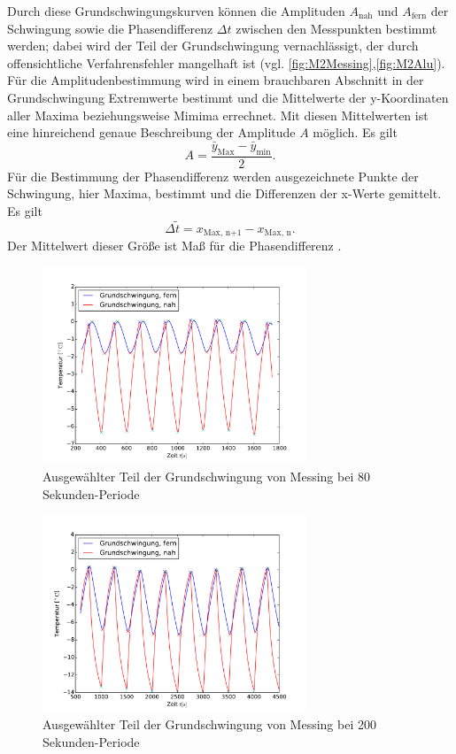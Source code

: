 Durch diese Grundschwingungskurven können die Amplituden $A_{\text{nah}}$ und $A_{\text{fern}}$ der Schwingung sowie die Phasendifferenz $\Delta t$ zwischen den Messpunkten bestimmt werden; 
dabei wird der Teil der Grundschwingung vernachlässigt, der durch offensichtliche Verfahrensfehler mangelhaft ist
(vgl. \ref{fig:M2Messing},\ref{fig:M2Alu}).
Für die Amplitudenbestimmung wird in einem brauchbaren Abschnitt in der Grundschwingung Extremwerte bestimmt und die Mittelwerte der y-Koordinaten aller Maxima beziehungsweise Mimima errechnet.
Mit diesen Mittelwerten ist eine hinreichend genaue Beschreibung der Amplitude $A$ möglich.
Es gilt
\begin{equation}
	A = \frac{\bar{y}_{\text{Max}}-\bar{y}_{\text{min}}}{2}.
\end{equation}
Für die Bestimmung der Phasendifferenz werden ausgezeichnete Punkte der Schwingung, hier Maxima, bestimmt und die Differenzen der x-Werte  gemittelt.
Es gilt
\begin{equation}
	\Delta \tilde{t} = {x}_{\text{Max, n+1}}-{x}_{\text{Max, n}}.
\end{equation}
Der Mittelwert dieser Größe ist Maß für die Phasendifferenz .
\begin{figure}[p]
	\label{fig:M2MessingNormkurve}
	\centering
	\includegraphics[width=0.7\textwidth]{Bilder/M2_Messing_norm.pdf}
	\caption{Ausgewählter Teil der Grundschwingung von Messing bei 80 Sekunden-Periode}
\end{figure}
\begin{figure}[p]
	\label{fig:M3MessingNormkurve}
	\centering
	\includegraphics[width=0.7\textwidth]{Bilder/M3_Messing_norm.pdf}
	\caption{Ausgewählter Teil der Grundschwingung von Messing bei 200 Sekunden-Periode}
\end{figure}
